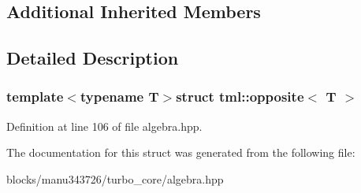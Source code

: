 \subsection*{Additional Inherited Members}


\subsection{Detailed Description}
\subsubsection*{template$<$typename T$>$struct tml\+::opposite$<$ T $>$}



Definition at line 106 of file algebra.\+hpp.



The documentation for this struct was generated from the following file\+:\begin{DoxyCompactItemize}
\item 
blocks/manu343726/turbo\+\_\+core/algebra.\+hpp\end{DoxyCompactItemize}
